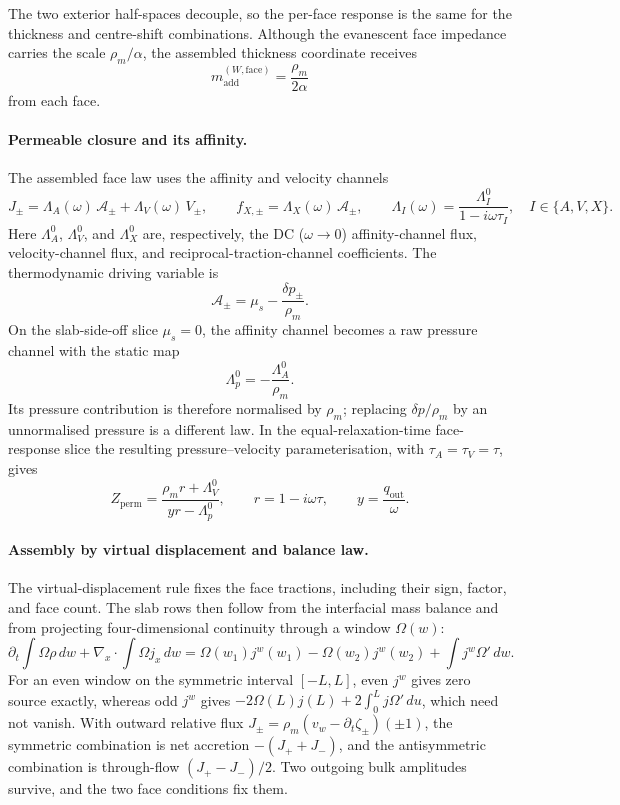 \noindent
The two exterior half-spaces decouple, so the per-face response is the same
for the thickness and centre-shift combinations. Although the evanescent face
impedance carries the scale \(\rho_m/\alpha\), the assembled thickness
coordinate receives
\[
  m_{\mathrm{add}}^{(W,\mathrm{face})}=\frac{\rho_m}{2\alpha}
\]
from each face.

\paragraph{Permeable closure and its affinity.}
The assembled face law uses the affinity and velocity channels
\[
  J_\pm=\Lambda_A(\omega)\,\mathcal A_\pm
       +\Lambda_V(\omega)\,V_\pm,
  \qquad
  f_{X,\pm}=\Lambda_X(\omega)\,\mathcal A_\pm,
  \qquad
  \Lambda_I(\omega)=\frac{\Lambda_I^0}{1-i\omega\tau_I},
  \quad I\in\{A,V,X\}.
\]
Here \(\Lambda_A^0\), \(\Lambda_V^0\), and \(\Lambda_X^0\) are,
respectively, the DC (\(\omega\to0\)) affinity-channel flux,
velocity-channel flux, and reciprocal-traction-channel coefficients. The
thermodynamic driving variable is
\[
  \mathcal A_\pm=\mu_s-\frac{\delta p_\pm}{\rho_m}.
\]
On the slab-side-off slice \(\mu_s=0\), the affinity channel becomes a raw
pressure channel with the static map
\[
  \Lambda_p^0=-\frac{\Lambda_A^0}{\rho_m}.
\]
Its pressure contribution is therefore normalised by \(\rho_m\); replacing
\(\delta p/\rho_m\) by an unnormalised pressure is a different law. In the
equal-relaxation-time face-response slice the resulting pressure--velocity
parameterisation, with \(\tau_A=\tau_V=\tau\), gives
\[
  Z_{\mathrm{perm}}
  =\frac{\rho_m r+\Lambda_V^0}{y r-\Lambda_p^0},
  \qquad
  r=1-i\omega\tau,
  \qquad
  y=\frac{q_{\mathrm{out}}}{\omega}.
\]

\paragraph{Assembly by virtual displacement and balance law.}
The virtual-displacement rule fixes the face tractions, including their sign,
factor, and face count. The slab rows then follow from the interfacial mass
balance and from projecting four-dimensional continuity through a window
\(\Omega(w)\):
\[
  \partial_t\!\int\!\Omega\rho\,dw
  +\nabla_x\!\cdot\!\int\!\Omega j_x\,dw
  =\Omega(w_1)j^w(w_1)-\Omega(w_2)j^w(w_2)
   +\int j^w\Omega'\,dw.
\]
For an even window on the symmetric interval \([-L,L]\), even \(j^w\)
gives zero source exactly, whereas odd \(j^w\) gives
\(-2\Omega(L)j(L)+2\int_0^L j\Omega'\,du\), which need not vanish. With
outward relative flux
\(J_\pm=\rho_m(v_w-\partial_t\zeta_\pm)(\pm1)\), the symmetric combination is
net accretion \(-\left(J_++J_-\right)\), and the antisymmetric combination is
through-flow \((J_+-J_-)/2\). Two outgoing bulk amplitudes survive, and the
two face conditions fix them.

